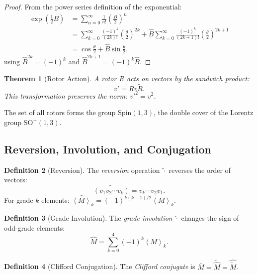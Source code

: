 \documentclass[11pt,a4paper]{article}
\numberwithin{equation}{section}
\theoremstyle{plain}
\newtheorem{theorem}{Theorem}[section]
\theoremstyle{definition}
\newtheorem{definition}[theorem]{Definition}
\theoremstyle{remark}
\newcommand{\grade}[2]{\left\langle #1 \right\rangle_{#2}}
\newcommand{\rev}[1]{\widetilde{#1}}       %
\newcommand{\Spin}{\mathrm{Spin}}
\newcommand{\SO}{\mathrm{SO}}
\begin{document}
\begin{proof}
From the power series definition of the exponential:
\begin{align}
\exp\left(\frac{1}{2}B\right) &= \sum_{n=0}^\infty \frac{1}{n!}\left(\frac{B}{2}\right)^n\\
&= \sum_{k=0}^\infty \frac{(-1)^k}{(2k)!}\left(\frac{\theta}{2}\right)^{2k} + \hat{B}\sum_{k=0}^\infty \frac{(-1)^k}{(2k+1)!}\left(\frac{\theta}{2}\right)^{2k+1}\\
&= \cos\frac{\theta}{2} + \hat{B}\sin\frac{\theta}{2},
\end{align}
using $\hat{B}^{2k} = (-1)^k$ and $\hat{B}^{2k+1} = (-1)^k\hat{B}$.
\end{proof}

\begin{theorem}[Rotor Action]
A rotor $R$ acts on vectors by the \emph{sandwich product}:
\begin{equation}
v' = R v \rev{R}.
\label{eq:rotor-action}
\end{equation}
This transformation preserves the norm: $v'^2 = v^2$.
\end{theorem}

The set of all rotors forms the group $\Spin(1,3)$, the double cover of the Lorentz group $\SO^+(1,3)$.

\subsection{Reversion, Involution, and Conjugation}

\begin{definition}[Reversion]
The \emph{reversion} operation $\rev{\cdot}$ reverses the order of vectors:
\begin{equation}
\rev{(v_1 v_2 \cdots v_k)} = v_k \cdots v_2 v_1.
\end{equation}
For grade-$k$ elements: $\rev{\grade{M}{k}} = (-1)^{k(k-1)/2}\grade{M}{k}$.
\end{definition}

\begin{definition}[Grade Involution]
The \emph{grade involution} $\hat{\cdot}$ changes the sign of odd-grade elements:
\begin{equation}
\hat{M} = \sum_{k=0}^4 (-1)^k \grade{M}{k}.
\end{equation}
\end{definition}

\begin{definition}[Clifford Conjugation]
The \emph{Clifford conjugate} is $\bar{M} = \rev{\hat{M}} = \widehat{\rev{M}}$.
\end{definition}
\end{document}
